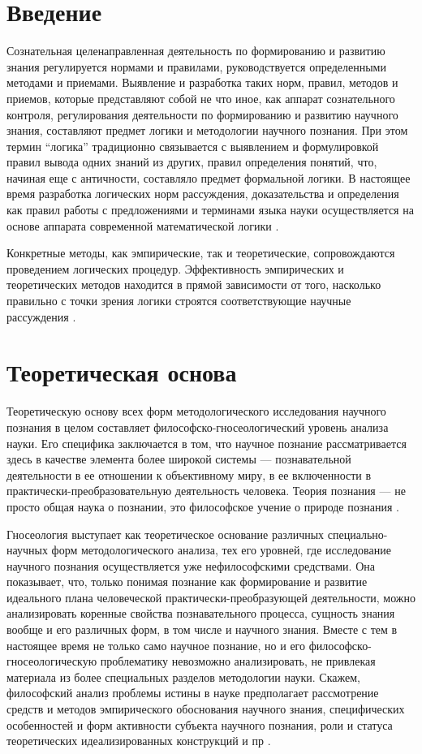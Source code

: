 \section*{Введение}

Сознательная целенаправленная деятельность по формированию и развитию знания регулируется нормами и правилами, руководствуется определенными методами и приемами. Выявление и разработка таких норм, правил, методов и приемов, которые представляют собой не что иное, как аппарат сознательного контроля, регулирования деятельности по формированию и развитию научного знания, составляют предмет логики и методологии научного познания. При этом термин ``логика'' традиционно связывается с выявлением и формулировкой правил вывода одних знаний из других, правил определения понятий, что, начиная еще с античности, составляло предмет формальной логики. В настоящее время разработка логических норм рассуждения, доказательства и определения как правил работы с предложениями и терминами языка науки осуществляется на основе аппарата современной математической логики \cite{mir:philosophy}.

Конкретные методы, как эмпирические, так и теоретические, сопровождаются проведением логических процедур. Эффективность эмпирических и теоретических методов находится в прямой зависимости от того, насколько правильно с точки зрения логики строятся соответствующие научные рассуждения \cite{lekt:logic}.

\section{Теоретическая основа}

Теоретическую основу всех форм методологического исследования научного познания в целом составляет философско-гносеологический уровень анализа науки. Его специфика заключается в том, что научное познание рассматривается здесь в качестве элемента более широкой системы --- познавательной деятельности в ее отношении к объективному миру, в ее включенности в практически-преобразовательную деятельность человека. Теория познания --- не просто общая наука о познании, это философское учение о природе познания \cite{mir:philosophy}.

Гносеология выступает как теоретическое основание различных специально-научных форм методологического анализа, тех его уровней, где исследование научного познания осуществляется уже нефилософскими средствами. Она показывает, что, только понимая познание как формирование и развитие идеального плана человеческой практически-преобразующей деятельности, можно анализировать коренные свойства познавательного процесса, сущность знания вообще и его различных форм, в том числе и научного знания. Вместе с тем в настоящее время не только само научное познание, но и его философско-гносеологическую проблематику невозможно анализировать, не привлекая материала из более специальных разделов методологии науки. Скажем, философский анализ проблемы истины в науке предполагает рассмотрение средств и методов эмпирического обоснования научного знания, специфических особенностей и форм активности субъекта научного познания, роли и статуса теоретических идеализированных конструкций и пр \cite{mir:philosophy}.

